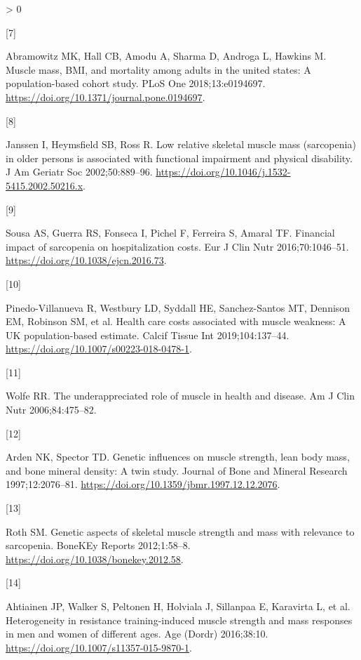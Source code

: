 \documentclass[twoside,10pt]{gihclass} %
\newlength{\cslhangindent}
\newlength{\csllabelwidth}
\newenvironment{CSLReferences}[3] %
 {%
  \setlength{\parindent}{0pt}
  \ifodd #1 \everypar{\setlength{\hangindent}{\cslhangindent}}\ignorespaces\fi
  \ifnum #2 > 0
  \setlength{\parskip}{#2\baselineskip}
  \fi
 }%
 {}
\newcommand{\CSLLeftMargin}[1]{\parbox[t]{\maxof{\widthof{#1}}{\csllabelwidth}}{#1}}
\newcommand{\CSLRightInline}[1]{\parbox[t]{\linewidth}{#1}}
\begin{document}
\begin{CSLReferences}{0}{0}
\leavevmode\hypertarget{ref-RN2516}{}%
\CSLLeftMargin{{[}7{]} }
\CSLRightInline{Abramowitz MK, Hall CB, Amodu A, Sharma D, Androga L, Hawkins M. Muscle mass, BMI, and mortality among adults in the united states: A population-based cohort study. PLoS One 2018;13:e0194697. \url{https://doi.org/10.1371/journal.pone.0194697}.}

\leavevmode\hypertarget{ref-RN2517}{}%
\CSLLeftMargin{{[}8{]} }
\CSLRightInline{Janssen I, Heymsfield SB, Ross R. Low relative skeletal muscle mass (sarcopenia) in older persons is associated with functional impairment and physical disability. J Am Geriatr Soc 2002;50:889--96. \url{https://doi.org/10.1046/j.1532-5415.2002.50216.x}.}

\leavevmode\hypertarget{ref-RN2532}{}%
\CSLLeftMargin{{[}9{]} }
\CSLRightInline{Sousa AS, Guerra RS, Fonseca I, Pichel F, Ferreira S, Amaral TF. Financial impact of sarcopenia on hospitalization costs. Eur J Clin Nutr 2016;70:1046--51. \url{https://doi.org/10.1038/ejcn.2016.73}.}

\leavevmode\hypertarget{ref-RN2184}{}%
\CSLLeftMargin{{[}10{]} }
\CSLRightInline{Pinedo-Villanueva R, Westbury LD, Syddall HE, Sanchez-Santos MT, Dennison EM, Robinson SM, et al. Health care costs associated with muscle weakness: A UK population-based estimate. Calcif Tissue Int 2019;104:137--44. \url{https://doi.org/10.1007/s00223-018-0478-1}.}

\leavevmode\hypertarget{ref-RN763}{}%
\CSLLeftMargin{{[}11{]} }
\CSLRightInline{Wolfe RR. The underappreciated role of muscle in health and disease. Am J Clin Nutr 2006;84:475--82.}

\leavevmode\hypertarget{ref-RN2526}{}%
\CSLLeftMargin{{[}12{]} }
\CSLRightInline{Arden NK, Spector TD. Genetic influences on muscle strength, lean body mass, and bone mineral density: A twin study. Journal of Bone and Mineral Research 1997;12:2076--81. \url{https://doi.org/10.1359/jbmr.1997.12.12.2076}.}

\leavevmode\hypertarget{ref-RN2527}{}%
\CSLLeftMargin{{[}13{]} }
\CSLRightInline{Roth SM. Genetic aspects of skeletal muscle strength and mass with relevance to sarcopenia. BoneKEy Reports 2012;1:58--8. \url{https://doi.org/10.1038/bonekey.2012.58}.}

\leavevmode\hypertarget{ref-RN1741}{}%
\CSLLeftMargin{{[}14{]} }
\CSLRightInline{Ahtiainen JP, Walker S, Peltonen H, Holviala J, Sillanpaa E, Karavirta L, et al. Heterogeneity in resistance training-induced muscle strength and mass responses in men and women of different ages. Age (Dordr) 2016;38:10. \url{https://doi.org/10.1007/s11357-015-9870-1}.}


\end{CSLReferences}
\end{document}
